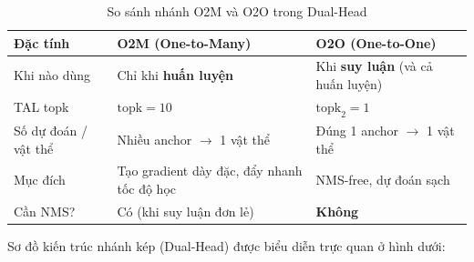 \begin{table}[H]
    \centering
    \caption{So sánh nhánh O2M và O2O trong Dual-Head}
    \label{tab:dual_head}
    \begin{tabularx}{\textwidth}{lXX}
        \toprule
        \textbf{Đặc tính} & \textbf{O2M (One-to-Many)} & \textbf{O2O (One-to-One)} \\
        \midrule
        Khi nào dùng & Chỉ khi \textbf{huấn luyện} & Khi \textbf{suy luận} (và cả huấn luyện) \\
        TAL topk     & $\text{topk} = 10$ & $\text{topk}_2 = 1$ \\
        Số dự đoán / vật thể & Nhiều anchor $\to$ 1 vật thể & Đúng 1 anchor $\to$ 1 vật thể \\
        Mục đích     & Tạo gradient dày đặc, đẩy nhanh tốc độ học & NMS-free, dự đoán sạch \\
        Cần NMS?     & Có (khi suy luận đơn lẻ) & \textbf{Không} \\
        \bottomrule
    \end{tabularx}
\end{table}

Sơ đồ kiến trúc nhánh kép (Dual-Head) được biểu diễn trực quan ở hình dưới:

